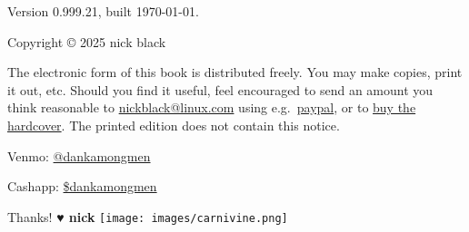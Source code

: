 \clearpage
Version 0.999.21, built \today.

Copyright © 2025 nick black

\bigskip
The electronic form of this book is distributed freely.
You may make copies, print it out, etc.
Should you find it useful, feel encouraged to send an amount you think reasonable to
  \href{mailto:nickblack@linux.com}{nickblack@linux.com} using
  e.g.\ \href{https://paypal.me/dankamongmen}{paypal},
  or to \href{https://goldandappelpub.com/pgo-quantitative.html}{buy the hardcover}.
The printed edition does not contain this notice.

\bigskip
Venmo: \href{https://venmo.com/?txn=pay&audience=public&recipients=nick\%20black&amount=10&note=pgo\%20book}{@dankamongmen}

Cashapp: \href{https://cash.app/\$dankamongmen}{\$dankamongmen}

\bigskip
Thanks! {\textbf{♥ nick}}
\vfill\texttt{[image: images/carnivine.png]}\vfill
